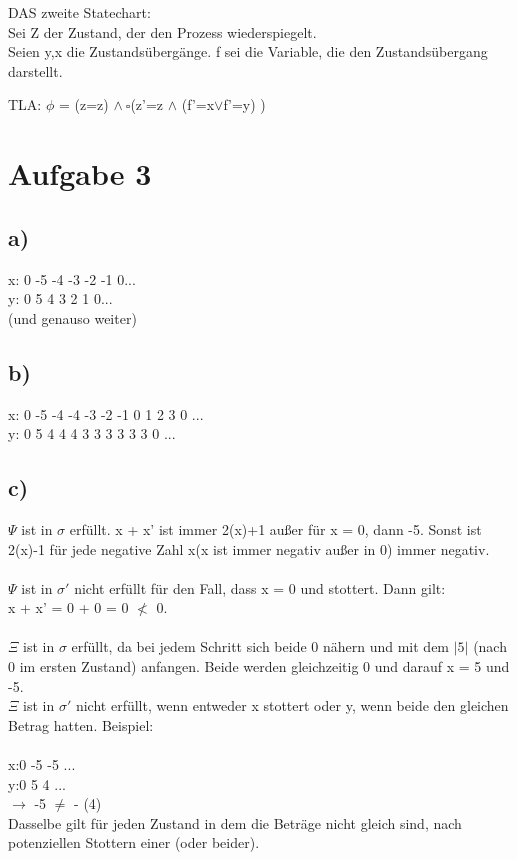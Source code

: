 \documentclass[]{article}
\begin{document}
DAS zweite Statechart: \\ Sei Z der Zustand, der den Prozess wiederspiegelt.\\ Seien y,x die Zustandsübergänge. f sei die Variable, die den Zustandsübergang darstellt.


TLA: $\phi$ = (z=z) $\land \ \square$(z'=z $\land$ (f'=x$\lor$f'=y) )  

\section*{Aufgabe 3}
\subsection*{a)}
x: 0 -5 -4 -3 -2 -1  0...\\
y: 0   5  4  3  2  1  0...\\
(und genauso weiter)
\subsection*{b)} 
x: 0 -5 -4 -4 -3 -2 -1  0  1  2  3 0 ...                                                                                            \\	
y: 0  5  4  4  4  3   3  3  3  3  3 0 ...                         
\subsection*{c) } 
$\Psi$ ist in $\sigma$ erfüllt.   x + x' ist immer 2(x)+1 außer für x = 0, dann -5. Sonst ist 2(x)-1 für jede negative Zahl x(x ist immer negativ außer in 0) immer negativ.      \\                                                         \\
$\Psi$ ist in $\sigma'$ nicht  erfüllt für den Fall, dass x = 0 und stottert. Dann gilt:\\ x + x' = 0 + 0 = 0 $\nless$ 0. \\ \\
$\Xi$ ist in $\sigma$ erfüllt, da bei jedem Schritt sich beide 0 nähern und mit dem $|5|$ (nach 0 im ersten Zustand) anfangen. Beide werden gleichzeitig 0 und darauf x = 5 und -5.
\\
$\Xi$ ist in $\sigma'$ nicht erfüllt, wenn entweder x stottert oder y, wenn beide den gleichen Betrag hatten. Beispiel: \\ \ \\
x:0 -5 -5 ...\\
y:0  5  4 ...\\
$\rightarrow$ -5 $\neq$ - (4) \\
Dasselbe gilt für jeden Zustand in dem die Beträge nicht gleich sind, nach potenziellen Stottern einer (oder beider).
\end{document}
